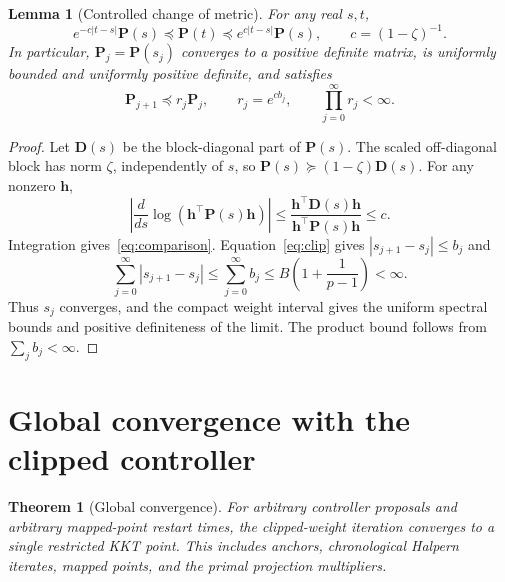 \documentclass[11pt]{article}
\newtheorem{lemma}{Lemma}
\newtheorem{theorem}{Theorem}
\begin{document}
\begin{lemma}[Controlled change of metric]
For any real $s,t$,
\begin{equation}
e^{-c|t-s|}\mathbf P(s)\preceq\mathbf P(t)\preceq e^{c|t-s|}\mathbf P(s),\qquad c=(1-\zeta)^{-1}.
\label{eq:comparison}
\end{equation}
In particular, $\mathbf P_j=\mathbf P(s_j)$ converges to a positive definite matrix, is uniformly bounded and uniformly positive definite, and satisfies
\begin{equation}
\mathbf P_{j+1}\preceq r_j\mathbf P_j,\qquad r_j=e^{cb_j},\qquad \prod_{j=0}^{\infty}r_j<\infty.
\label{eq:product}
\end{equation}
\end{lemma}

\begin{proof}
Let $\mathbf D(s)$ be the block-diagonal part of $\mathbf P(s)$.
The scaled off-diagonal block has norm $\zeta$, independently of $s$, so $\mathbf P(s)\succeq(1-\zeta)\mathbf D(s)$.
For any nonzero $\mathbf h$,
\begin{equation}
\left|\frac{d}{ds}\log(\mathbf h^\top\mathbf P(s)\mathbf h)\right|\leq\frac{\mathbf h^\top\mathbf D(s)\mathbf h}{\mathbf h^\top\mathbf P(s)\mathbf h}\leq c.
\end{equation}
Integration gives~\eqref{eq:comparison}.
Equation~\eqref{eq:clip} gives $|s_{j+1}-s_j|\leq b_j$ and
\begin{equation}
\sum_{j=0}^{\infty}|s_{j+1}-s_j|\leq\sum_{j=0}^{\infty}b_j\leq B\left(1+\frac{1}{p-1}\right)<\infty.
\end{equation}
Thus $s_j$ converges, and the compact weight interval gives the uniform spectral bounds and positive definiteness of the limit.
The product bound follows from $\sum_jb_j<\infty$.
\end{proof}

\section{Global convergence with the clipped controller}

\begin{theorem}[Global convergence]
For arbitrary controller proposals and arbitrary mapped-point restart times, the clipped-weight iteration converges to a single restricted KKT point.
This includes anchors, chronological Halpern iterates, mapped points, and the primal projection multipliers.
\end{theorem}
\end{document}
